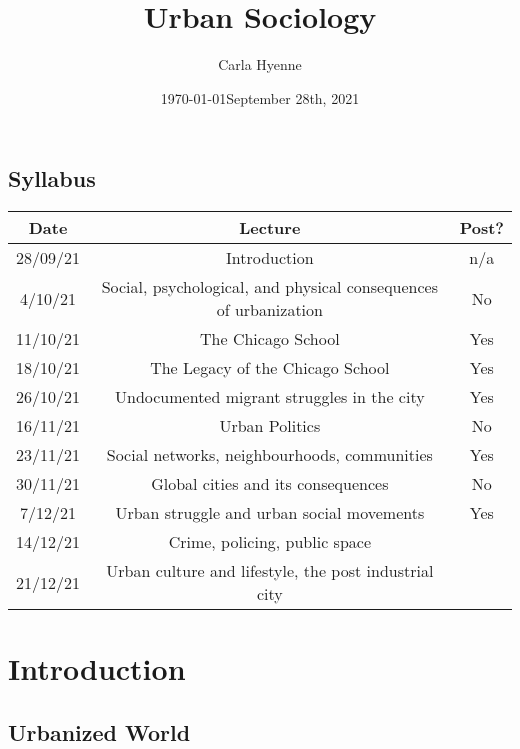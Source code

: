 \documentclass{article}
\title{Urban Sociology}
\author{Carla Hyenne }
\date{\today}
\begin{document}
\maketitle

\tableofcontents

\subsection{Syllabus}

\begin{tabular}{|c|c|c|}
	\hline
	Date & Lecture & Post? \\ 
	 \hline
	28/09/21 & Introduction & n/a  \\  
	 \hline
	4/10/21 & Social, psychological, and physical consequences of urbanization & No \\   
	 \hline
	 11/10/21 & The Chicago School & Yes \\
	 \hline
	 18/10/21 & The Legacy of the Chicago School & Yes \\   
	 \hline
	 26/10/21 & Undocumented migrant struggles in the city & Yes  \\   
	  \hline
	 16/11/21 & Urban Politics &  No \\   
	 \hline
	 23/11/21 & Social networks, neighbourhoods, communities & Yes  \\   
	 \hline
	 30/11/21 & Global cities and its consequences & No  \\   
	  \hline
	 7/12/21 & Urban struggle and urban social movements & Yes  \\   
	 \hline
	 14/12/21 & Crime, policing, public space &  \\   
	 \hline
	 21/12/21 & Urban culture and lifestyle, the post industrial city &  \\ 
	 \hline
\end{tabular}

\pagebreak


\section{Introduction}
\date{September 28th, 2021}

\subsection{Urbanized World}
\end{document}
